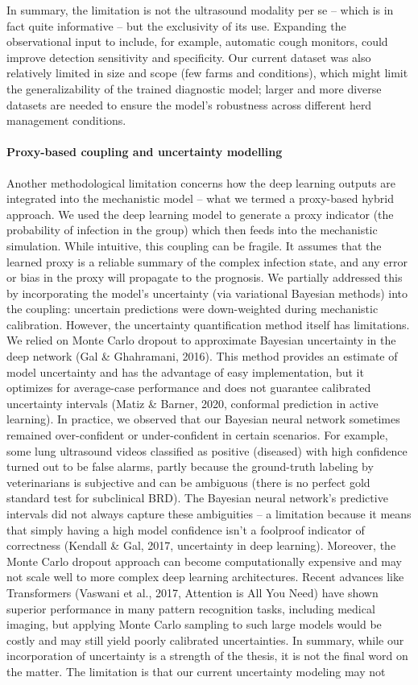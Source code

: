 In summary, the limitation is not the ultrasound modality per se – which is in fact quite informative – but the exclusivity of its use. Expanding the observational input to include, for example, automatic cough monitors, could improve detection sensitivity and specificity. Our current dataset was also relatively limited in size and scope (few farms and conditions), which might limit the generalizability of the trained diagnostic model; larger and more diverse datasets are needed to ensure the model’s robustness across different herd management conditions.

\paragraph{Proxy-based coupling and uncertainty modelling} Another methodological limitation concerns how the deep learning outputs are integrated into the mechanistic model – what we termed a proxy-based hybrid approach. We used the deep learning model to generate a proxy indicator (the probability of infection in the group) which then feeds into the mechanistic simulation. While intuitive, this coupling can be fragile. It assumes that the learned proxy is a reliable summary of the complex infection state, and any error or bias in the proxy will propagate to the prognosis. We partially addressed this by incorporating the model’s uncertainty (via variational Bayesian methods) into the coupling: uncertain predictions were down-weighted during mechanistic calibration. However, the uncertainty quantification method itself has limitations. We relied on Monte Carlo dropout to approximate Bayesian uncertainty in the deep network (Gal \& Ghahramani, 2016). This method provides an estimate of model uncertainty and has the advantage of easy implementation, but it optimizes for average-case performance and does not guarantee calibrated uncertainty intervals (Matiz \& Barner, 2020, conformal prediction in active learning). In practice, we observed that our Bayesian neural network sometimes remained over-confident or under-confident in certain scenarios. For example, some lung ultrasound videos classified as positive (diseased) with high confidence turned out to be false alarms, partly because the ground-truth labeling by veterinarians is subjective and can be ambiguous (there is no perfect gold standard test for subclinical BRD). The Bayesian neural network’s predictive intervals did not always capture these ambiguities – a limitation because it means that simply having a high model confidence isn’t a foolproof indicator of correctness (Kendall \& Gal, 2017, uncertainty in deep learning). Moreover, the Monte Carlo dropout approach can become computationally expensive and may not scale well to more complex deep learning architectures. Recent advances like Transformers (Vaswani et al., 2017, Attention is All You Need) have shown superior performance in many pattern recognition tasks, including medical imaging, but applying Monte Carlo sampling to such large models would be costly and may still yield poorly calibrated uncertainties. In summary, while our incorporation of uncertainty is a strength of the thesis, it is not the final word on the matter. The limitation is that our current uncertainty modeling may not 
